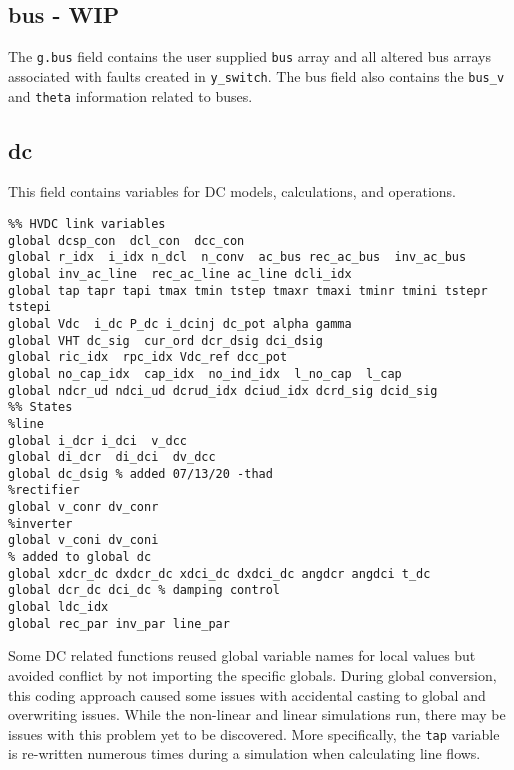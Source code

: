 \subsection{bus - WIP}  
The \verb|g.bus| field contains the user supplied \verb|bus| array and all altered bus arrays associated with faults created in \verb|y_switch|.
The bus field also contains the \verb|bus_v| and \verb|theta| information related to buses.


\subsection{dc}
This field contains variables for DC models, calculations, and operations.
\begin{verbatim}
%% HVDC link variables 
global dcsp_con  dcl_con  dcc_con
global r_idx  i_idx n_dcl  n_conv  ac_bus rec_ac_bus  inv_ac_bus
global inv_ac_line  rec_ac_line ac_line dcli_idx
global tap tapr tapi tmax tmin tstep tmaxr tmaxi tminr tmini tstepr tstepi
global Vdc  i_dc P_dc i_dcinj dc_pot alpha gamma 
global VHT dc_sig  cur_ord dcr_dsig dci_dsig
global ric_idx  rpc_idx Vdc_ref dcc_pot
global no_cap_idx  cap_idx  no_ind_idx  l_no_cap  l_cap
global ndcr_ud ndci_ud dcrud_idx dciud_idx dcrd_sig dcid_sig
%% States
%line
global i_dcr i_dci  v_dcc
global di_dcr  di_dci  dv_dcc
global dc_dsig % added 07/13/20 -thad
%rectifier
global v_conr dv_conr
%inverter
global v_coni dv_coni
% added to global dc
global xdcr_dc dxdcr_dc xdci_dc dxdci_dc angdcr angdci t_dc
global dcr_dc dci_dc % damping control
global ldc_idx
global rec_par inv_par line_par
\end{verbatim}

Some DC related functions reused global variable names for local values but avoided conflict by not importing the specific globals.
During global conversion, this coding approach caused some issues with accidental casting to global and overwriting issues.
While the non-linear and linear simulations run, there may be issues with this problem yet to be discovered.
More specifically, the \verb|tap| variable is re-written numerous times during a simulation when calculating line flows.



